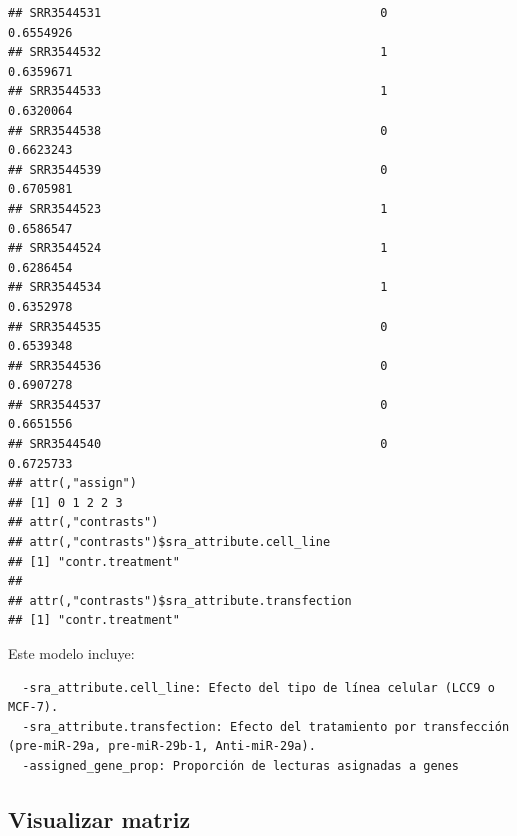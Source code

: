 \documentclass[
]{article}
\newenvironment{Shaded}{\begin{snugshade}}{\end{snugshade}}
\newcommand{\AttributeTok}[1]{\textcolor[rgb]{0.13,0.29,0.53}{#1}}
\newcommand{\CommentTok}[1]{\textcolor[rgb]{0.56,0.35,0.01}{\textit{#1}}}
\newcommand{\DecValTok}[1]{\textcolor[rgb]{0.00,0.00,0.81}{#1}}
\newcommand{\DocumentationTok}[1]{\textcolor[rgb]{0.56,0.35,0.01}{\textbf{\textit{#1}}}}
\newcommand{\FunctionTok}[1]{\textcolor[rgb]{0.13,0.29,0.53}{\textbf{#1}}}
\newcommand{\NormalTok}[1]{#1}
\newcommand{\OtherTok}[1]{\textcolor[rgb]{0.56,0.35,0.01}{#1}}
\newcommand{\SpecialCharTok}[1]{\textcolor[rgb]{0.81,0.36,0.00}{\textbf{#1}}}
\begin{document}
\begin{verbatim}
## SRR3544531                                       0          0.6554926
## SRR3544532                                       1          0.6359671
## SRR3544533                                       1          0.6320064
## SRR3544538                                       0          0.6623243
## SRR3544539                                       0          0.6705981
## SRR3544523                                       1          0.6586547
## SRR3544524                                       1          0.6286454
## SRR3544534                                       1          0.6352978
## SRR3544535                                       0          0.6539348
## SRR3544536                                       0          0.6907278
## SRR3544537                                       0          0.6651556
## SRR3544540                                       0          0.6725733
## attr(,"assign")
## [1] 0 1 2 2 3
## attr(,"contrasts")
## attr(,"contrasts")$sra_attribute.cell_line
## [1] "contr.treatment"
## 
## attr(,"contrasts")$sra_attribute.transfection
## [1] "contr.treatment"
\end{verbatim}

Este modelo incluye:

\begin{verbatim}
  -sra_attribute.cell_line: Efecto del tipo de línea celular (LCC9 o MCF-7).
  -sra_attribute.transfection: Efecto del tratamiento por transfección (pre-miR-29a, pre-miR-29b-1, Anti-miR-29a).
  -assigned_gene_prop: Proporción de lecturas asignadas a genes
\end{verbatim}

\subsection{Visualizar matriz}\label{visualizar-matriz}

\begin{Shaded}
\end{Shaded}
\end{document}
